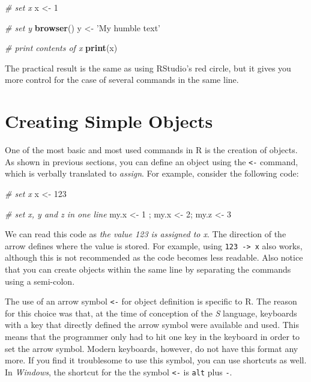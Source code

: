 \documentclass[11pt,]{book}
\newenvironment{Shaded}{\begin{snugshade}}{\end{snugshade}}
\newcommand{\KeywordTok}[1]{\textcolor[rgb]{0.27,0.27,0.27}{\textbf{#1}}}
\newcommand{\DecValTok}[1]{\textcolor[rgb]{0.06,0.06,0.06}{#1}}
\newcommand{\StringTok}[1]{\textcolor[rgb]{0.5,0.5,0.5}{#1}}
\newcommand{\CommentTok}[1]{\textcolor[rgb]{0.56,0.35,0.01}{\textit{#1}}}
\newcommand{\NormalTok}[1]{#1}
\begin{document}
\begin{Shaded}
\begin{Highlighting}[]
\CommentTok{# set x}
\NormalTok{x <-}\StringTok{ }\DecValTok{1}

\CommentTok{# set y}
\KeywordTok{browser}\NormalTok{()}
\NormalTok{y <-}\StringTok{ 'My humble text'}

\CommentTok{# print contents of x}
\KeywordTok{print}\NormalTok{(x)}
\end{Highlighting}
\end{Shaded}

The practical result is the same as using RStudio's red circle, but it
gives you more control for the case of several commands in the same
line.

\section{Creating Simple Objects}\label{creating-simple-objects}

One of the most basic and most used commands in R is the creation of
objects. As shown in previous sections, you can define an object using
the \texttt{\textless{}-} command, which is verbally translated to
\emph{assign}. For example, consider the following code: 

\begin{Shaded}
\begin{Highlighting}[]
\CommentTok{# set x}
\NormalTok{x <-}\StringTok{ }\DecValTok{123}

\CommentTok{# set x, y and z in one line}
\NormalTok{my.x <-}\StringTok{ }\DecValTok{1}\NormalTok{ ; my.x <-}\StringTok{ }\DecValTok{2}\NormalTok{; my.z <-}\StringTok{ }\DecValTok{3}
\end{Highlighting}
\end{Shaded}

We can read this code as \emph{the value 123 is assigned to x}. The
direction of the arrow defines where the value is stored. For example,
using \texttt{123\ -\textgreater{}\ x} also works, although this is not
recommended as the code becomes less readable. Also notice that you can
create objects within the same line by separating the commands using a
semi-colon.

The use of an arrow symbol \texttt{\textless{}-} for object definition
is specific to R. The reason for this choice was that, at the time of
conception of the \emph{S} language, keyboards with a key that directly
defined the arrow symbol were available and used. This means that the
programmer only had to hit one key in the keyboard in order to set the
arrow symbol. Modern keyboards, however, do not have this format any
more. If you find it troublesome to use this symbol, you can use
shortcuts as well. In \emph{Windows}, the shortcut for the the symbol
\texttt{\textless{}-} is \texttt{alt} plus \texttt{-}.
\end{document}
